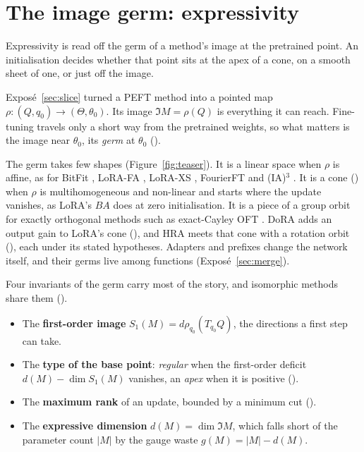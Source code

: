 \section{The image germ: expressivity}\label{sec:image}

Expressivity is read off the germ of a method's image at the pretrained point. An initialisation decides whether that
point sits at the apex of a cone, on a smooth sheet of one, or just off the image.

Exposé~\ref{sec:slice} turned a PEFT method into a pointed map $\rho:(Q,q_0)\to(\Theta,\theta_0)$. Its image
$\Im M=\rho(Q)$ is everything it can reach. Fine-tuning travels only a short way from the pretrained weights, so what
matters is the image near $\theta_0$, its \emph{germ} at $\theta_0$ ().

The germ takes few shapes (Figure~\ref{fig:teaser}). It is a linear space when $\rho$ is affine, as for BitFit
\citep{benzaken2021bitfit}, LoRA-FA \citep{zhang2023lora}, LoRA-XS \citep{baazy2024lora}, FourierFT
\citep{gao2024parameter} and (IA)$^3$ \citep{liu2022few}. It is a cone () when $\rho$ is multihomogeneous
and non-linear and starts where the update vanishes, as LoRA's $BA$ \citep{hu2021lora} does at zero initialisation. It
is a piece of a group orbit for exactly orthogonal methods such as exact-Cayley OFT \citep{qiu2023controlling}. DoRA
\citep{liu2024dora} adds an output gain to LoRA's cone (), and HRA \citep{yuan2024bridging}
meets that cone with a rotation orbit (), each under its stated hypotheses. Adapters and prefixes
change the network itself, and their germs live among functions (Exposé~\ref{sec:merge}).

Four invariants of the germ carry most of the story, and isomorphic methods share them ().
\begin{itemize}
  \item The \textbf{first-order image} $S_1(M)=d\rho_{q_0}(T_{q_0}Q)$, the directions a first step can take.
  \item The \textbf{type of the base point}: \emph{regular} when the first-order deficit $d(M)-\dim S_1(M)$ vanishes,
    an \emph{apex} when it is positive ().
  \item The \textbf{maximum rank} of an update, bounded by a minimum cut ().
  \item The \textbf{expressive dimension} $d(M)=\dim\Im M$, which falls short of the parameter count $|M|$ by the
    gauge waste $g(M)=|M|-d(M)$.
\end{itemize}

